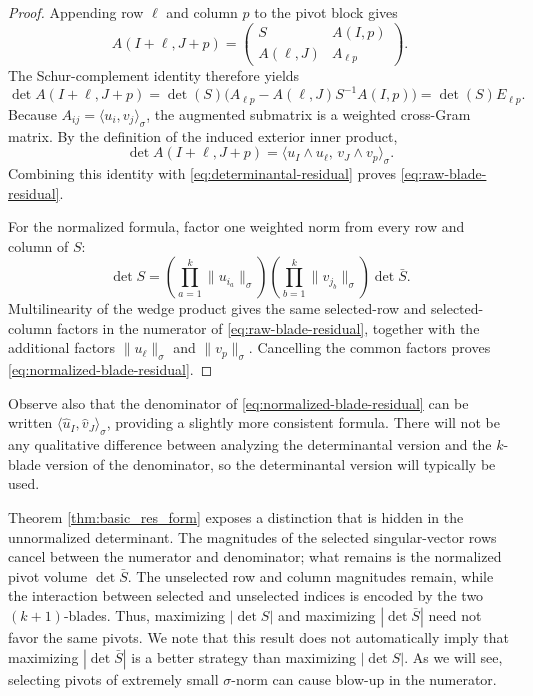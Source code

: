 \documentclass[11pt, preprint]{article}
\newcommand{\inner}[1]{\langle #1\rangle}
\begin{document}
\begin{proof}
Appending row $\ell$ and column $p$ to the pivot block gives
\[
A(I+\ell,J+p)
=
\begin{pmatrix}
S & A(I,p)\\
A(\ell,J) & A_{\ell p}
\end{pmatrix}.
\]
The Schur-complement identity therefore yields
\begin{equation}\label{eq:determinantal-residual}
\det A(I+\ell,J+p)
=
\det(S)\big(A_{\ell p}-A(\ell,J)S^{-1}A(I,p)\big)
=
\det(S)E_{\ell p}.
\end{equation}
Because $A_{ij}=\inner{u_i,v_j}_\sigma$, the augmented submatrix is a weighted cross-Gram matrix. By the definition of the induced exterior inner product,
\[
\det A(I+\ell,J+p)
=
\inner{u_I\wedge u_\ell,\,v_J\wedge v_p}_\sigma.
\]
Combining this identity with \eqref{eq:determinantal-residual} proves \eqref{eq:raw-blade-residual}.

For the normalized formula, factor one weighted norm from every row and column of $S$:
\[
\det S
=
\left(\prod_{a=1}^k\|u_{i_a}\|_\sigma\right)
\left(\prod_{b=1}^k\|v_{j_b}\|_\sigma\right)
\det\bar S.
\]
Multilinearity of the wedge product gives the same selected-row and selected-column factors in the numerator of \eqref{eq:raw-blade-residual}, together with the additional factors $\|u_\ell\|_\sigma$ and $\|v_p\|_\sigma$. Cancelling the common factors proves \eqref{eq:normalized-blade-residual}.
\end{proof}

Observe also that the denominator of \eqref{eq:normalized-blade-residual} can be written $\inner{\widehat u_I, \widehat v_J}_\sigma$, providing a slightly more consistent formula. There will not be any qualitative difference between analyzing the determinantal version and the $k$-blade version of the denominator, so the determinantal version will typically be used. 

Theorem \ref{thm:basic_res_form} exposes a distinction that is hidden in the unnormalized determinant. The magnitudes of the selected singular-vector rows cancel between the numerator and denominator; what remains is the normalized pivot volume $\det\bar S$. The unselected row and column magnitudes remain, while the interaction between selected and unselected indices is encoded by the two $(k+1)$-blades. Thus, maximizing $|\det S|$ and maximizing $|\det\bar S|$ need not favor the same pivots. We note that this result does not automatically imply that maximizing $|\det\bar{S}|$ is a better strategy than maximizing $|\det S|$. As we will see, selecting pivots of extremely small $\sigma$-norm can cause blow-up in the numerator. 
\end{document}
